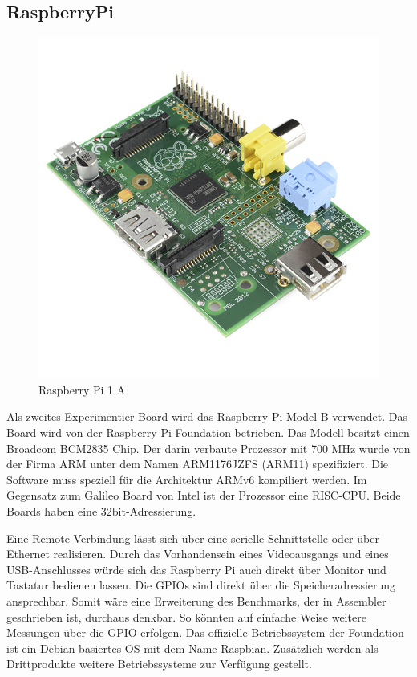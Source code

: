 \subsection{RaspberryPi}


\begin{figure}
\centering
\includegraphics[scale=0.4]{images/raspberry-pi-2.png}
\caption{Raspberry Pi 1 A\cite{raspberry_image}}
\label{fig:Raspberry Pi 1 A}
\end{figure}


Als zweites Experimentier-Board wird das Raspberry Pi Model B\cite{raspberry_foundation} verwendet. Das Board wird von der Raspberry Pi Foundation betrieben. Das Modell besitzt einen Broadcom BCM2835\cite{broadcom_datasheet} Chip. Der darin verbaute Prozessor mit 700 MHz wurde von der Firma ARM unter dem Namen ARM1176JZFS\cite{arm_datasheet} (ARM11) spezifiziert. Die Software muss speziell für die Architektur ARMv6 kompiliert werden. Im Gegensatz zum Galileo Board von Intel ist der Prozessor eine RISC-CPU. Beide Boards haben eine 32bit-Adressierung.
\par
Eine Remote-Verbindung lässt sich über eine serielle Schnittstelle oder über Ethernet realisieren. Durch das Vorhandensein eines Videoausgangs und eines USB-Anschlusses würde sich das Raspberry Pi auch direkt über Monitor und Tastatur bedienen lassen. Die GPIOs sind direkt über die Speicheradressierung ansprechbar. Somit wäre eine Erweiterung des Benchmarks, der in Assembler geschrieben ist, durchaus denkbar. So könnten auf einfache Weise weitere Messungen über die GPIO erfolgen. Das offizielle Betriebssystem der Foundation ist ein Debian basiertes OS mit dem Name Raspbian. Zusätzlich werden als Drittprodukte weitere Betriebssysteme zur Verfügung gestellt. 











